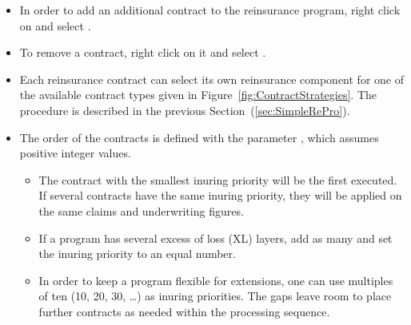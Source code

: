 \begin{itemize}
	\item In order to add an additional contract to the reinsurance program, right click on  and select .
	\item To remove a contract, right click on it and select .
	\item Each reinsurance contract can select its own reinsurance component for one of the available contract types given in Figure~\ref{fig:ContractStrategies}. The procedure is described in the previous Section~(\ref{sec:SimpleRePro}).
	\item The order of the contracts is defined with the parameter , which assumes positive integer values.
	\begin{itemize}
		\item The contract with the smallest inuring priority will be the first executed. If several contracts have the same inuring priority, they will be applied on the same  claims and underwriting figures.
		\item If a program has several excess of loss (XL) layers, add as many  and set the inuring priority to an equal number.
		\item In order to keep a program flexible for extensions, one can use \eg multiples of ten (10, 20, 30, \ldots) as inuring priorities. The gaps leave room to place further contracts as needed within the processing sequence.
	\end{itemize}
\end{itemize}

